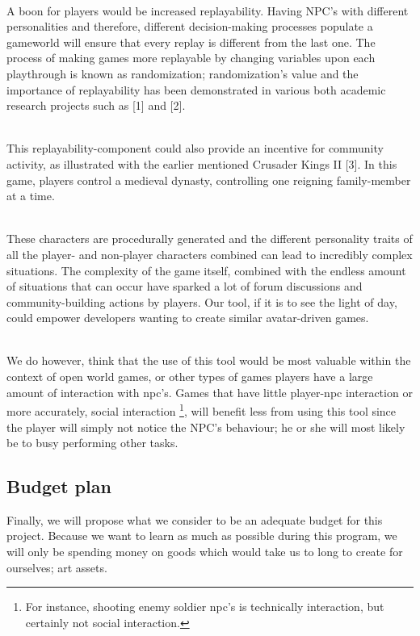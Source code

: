 \documentclass[11pt]{article}
\begin{document}
~\\
A boon for players would be increased replayability. Having NPC's with different personalities and therefore, different decision-making processes populate a gameworld will ensure that every replay is different from the last one. The process of making games more replayable by changing variables upon each playthrough is known as randomization; randomization's value and the importance of replayability has been demonstrated in various both academic research projects such as [1] and [2].

~\\
This replayability-component could also provide an incentive for community activity, as illustrated with the earlier mentioned Crusader Kings II [3]. In this game, players control a medieval dynasty, controlling one reigning family-member at a time. 

~\\
These characters are procedurally generated and the different personality traits of all the player- and non-player characters combined can lead to incredibly complex situations. The complexity of the game itself, combined with the endless amount of situations that can occur have sparked a lot of forum discussions and community-building actions by players. Our tool, if it is to see the light of day, could empower developers wanting to create similar avatar-driven games.

~\\
We do however, think that the use of this tool would be most valuable within the context of open world games, or other types of games players have a large amount of interaction with npc's. Games that have little player-npc interaction or more accurately, social interaction \footnote{For instance, shooting enemy soldier npc's is technically interaction, but certainly not social interaction.}, will benefit less from using this tool since the player will simply not notice the NPC's behaviour; he or she will most likely be to busy performing other tasks.


\newpage
{}
{}
\subsection*{Budget plan}
Finally, we will propose what we consider to be an adequate budget for this project. Because we want to learn as much as possible during this program, we will only be spending money on goods which would take us to long to create for ourselves; art assets. 
\end{document}
